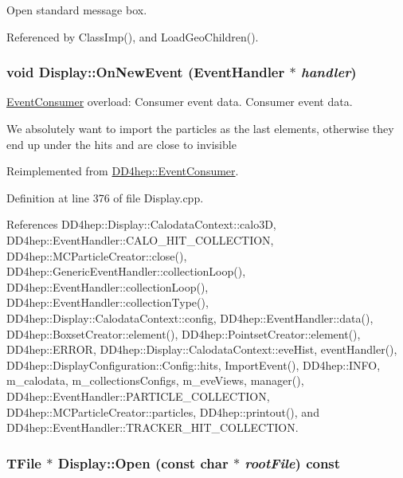 Open standard message box. 

Referenced by ClassImp(), and LoadGeoChildren().\hypertarget{class_d_d4hep_1_1_display_a6bde493af2434cc4d59fa8b6b0e58058}{
\subsubsection[{OnNewEvent}]{\setlength{\rightskip}{0pt plus 5cm}void Display::OnNewEvent ({\bf EventHandler} $\ast$ {\em handler})}}
\label{class_d_d4hep_1_1_display_a6bde493af2434cc4d59fa8b6b0e58058}


\hyperlink{class_d_d4hep_1_1_event_consumer}{EventConsumer} overload: Consumer event data. Consumer event data. 

We absolutely want to import the particles as the last elements, otherwise they end up under the hits and are close to invisible 

Reimplemented from \hyperlink{class_d_d4hep_1_1_event_consumer_a755b12d11f8676c4f2957f6a1f26fb31}{DD4hep::EventConsumer}.

Definition at line 376 of file Display.cpp.

References DD4hep::Display::CalodataContext::calo3D, DD4hep::EventHandler::CALO\_\-HIT\_\-COLLECTION, DD4hep::MCParticleCreator::close(), DD4hep::GenericEventHandler::collectionLoop(), DD4hep::EventHandler::collectionLoop(), DD4hep::EventHandler::collectionType(), DD4hep::Display::CalodataContext::config, DD4hep::EventHandler::data(), DD4hep::BoxsetCreator::element(), DD4hep::PointsetCreator::element(), DD4hep::ERROR, DD4hep::Display::CalodataContext::eveHist, eventHandler(), DD4hep::DisplayConfiguration::Config::hits, ImportEvent(), DD4hep::INFO, m\_\-calodata, m\_\-collectionsConfigs, m\_\-eveViews, manager(), DD4hep::EventHandler::PARTICLE\_\-COLLECTION, DD4hep::MCParticleCreator::particles, DD4hep::printout(), and DD4hep::EventHandler::TRACKER\_\-HIT\_\-COLLECTION.\hypertarget{class_d_d4hep_1_1_display_a5ff3cbb2776e91975554ca8beedc82d9}{
\subsubsection[{Open}]{\setlength{\rightskip}{0pt plus 5cm}TFile $\ast$ Display::Open (const char $\ast$ {\em rootFile}) const}}
\label{class_d_d4hep_1_1_display_a5ff3cbb2776e91975554ca8beedc82d9}


